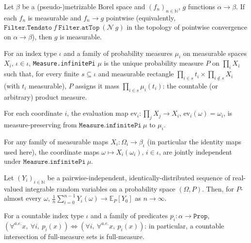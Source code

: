\begin{proposition}
  Let $\beta$ be a (pseudo-)metrizable Borel space and $(f_n)_{n\in\mathbb{N}}$, $g$ functions
  $\alpha \to \beta$. If each $f_n$ is measurable and $f_n \to g$ pointwise (equivalently,
  $\texttt{Filter.Tendsto}\ f\ \texttt{Filter.atTop}\ (\mathcal{N}\ g)$ in the topology of
  pointwise convergence on $\alpha \to \beta$), then $g$ is measurable.
\end{proposition}

\begin{definition}
  For an index type $\iota$ and a family of probability measures $\mu_i$ on measurable spaces
  $X_i$, $\iota \in \iota$, \texttt{Measure.infinitePi} $\mu$ is the unique probability measure
  $P$ on $\prod_{i} X_i$ such that, for every finite $s \subseteq \iota$ and measurable
  rectangle $\prod_{i \in s} t_i \times \prod_{i \notin s} X_i$ (with $t_i$ measurable),
  $P$ assigns it mass $\prod_{i \in s} \mu_i(t_i)$: the countable (or arbitrary) product measure.
\end{definition}

\begin{proposition}
  For each coordinate $i$, the evaluation map $\mathrm{ev}_i \colon \prod_j X_j \to X_i$,
  $\mathrm{ev}_i(\omega) = \omega_i$, is measure-preserving from $\texttt{Measure.infinitePi}\ \mu$
  to $\mu_i$.
\end{proposition}

\begin{proposition}
  For any family of measurable maps $X_i \colon \Omega_i \to \beta_i$ (in particular the identity
  maps used here), the coordinate maps $\omega \mapsto X_i(\omega_i)$, $i \in \iota$, are jointly
  independent under $\texttt{Measure.infinitePi}\ \mu$.
\end{proposition}

\begin{proposition}
  Let $(Y_i)_{i\in\mathbb{N}}$ be a pairwise-independent, identically-distributed sequence of
  real-valued integrable random variables on a probability space $(\Omega,P)$. Then, for
  $P$-almost every $\omega$, $\frac{1}{n}\sum_{i=0}^{n-1} Y_i(\omega) \to \mathbb{E}_P[Y_0]$ as
  $n \to \infty$.
\end{proposition}

\begin{proposition}
  For a countable index type $\iota$ and a family of predicates $p_i \colon \alpha \to
  \texttt{Prop}$, $(\forall^{a.e.} x,\ \forall i,\ p_i(x)) \iff (\forall i,\ \forall^{a.e.} x,\
  p_i(x))$: in particular, a countable intersection of full-measure sets is full-measure.
\end{proposition}
